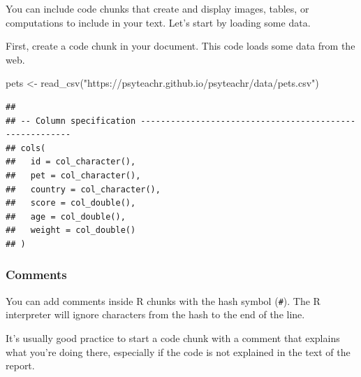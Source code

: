 \documentclass[
  oneside]{book}
\newenvironment{Shaded}{\begin{snugshade}}{\end{snugshade}}
\newcommand{\CommentTok}[1]{\textcolor[rgb]{0.56,0.35,0.01}{\textit{#1}}}
\newcommand{\FunctionTok}[1]{\textcolor[rgb]{0.00,0.00,0.00}{#1}}
\newcommand{\NormalTok}[1]{#1}
\newcommand{\OtherTok}[1]{\textcolor[rgb]{0.56,0.35,0.01}{#1}}
\newcommand{\SpecialCharTok}[1]{\textcolor[rgb]{0.00,0.00,0.00}{#1}}
\newcommand{\StringTok}[1]{\textcolor[rgb]{0.31,0.60,0.02}{#1}}
\begin{document}
You can include code chunks that create and display images, tables, or computations to include in your text. Let's start by loading some data.

First, create a code chunk in your document. This code loads some data from the web.

\begin{Shaded}
\begin{Highlighting}[]
\NormalTok{pets }\OtherTok{\textless{}{-}} \FunctionTok{read\_csv}\NormalTok{(}\StringTok{"https://psyteachr.github.io/psyteachr/data/pets.csv"}\NormalTok{)}
\end{Highlighting}
\end{Shaded}

\begin{verbatim}
## 
## -- Column specification --------------------------------------------------------
## cols(
##   id = col_character(),
##   pet = col_character(),
##   country = col_character(),
##   score = col_double(),
##   age = col_double(),
##   weight = col_double()
## )
\end{verbatim}

\hypertarget{comments}{%
\subsubsection{Comments}\label{comments}}

You can add comments inside R chunks with the hash symbol (\texttt{\#}). The R interpreter will ignore characters from the hash to the end of the line.

\begin{Shaded}
\end{Shaded}

It's usually good practice to start a code chunk with a comment that explains what you're doing there, especially if the code is not explained in the text of the report.
\end{document}
